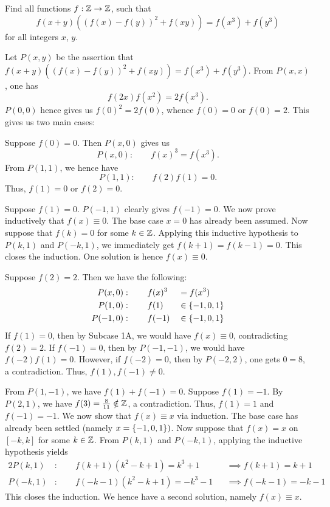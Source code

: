 \begin{question}\label{A::2023-O-2-4}
    Find all functions $f : \mathbb{Z} \to \mathbb{Z}$, such that \[f(x+y)((f(x) - f(y))^2 + f(xy)) = f(x^3) + f(y^3)\] for all integers $x$, $y$.
\end{question}
\begin{solution*}
    Let $P(x, y)$ be the assertion that $f(x+y)((f(x) - f(y))^2 + f(xy)) = f(x^3) + f(y^3)$. From $P(x, x)$, one has \[f(2x)f(x^2) = 2f(x^3).\] $P(0, 0)$ hence gives us $f(0)^2 = 2f(0)$, whence $f(0) = 0$ or $f(0) = 2$. This gives us two main cases:

     Suppose $f(0) = 0$. Then $P(x, 0)$ gives us \[P(x, 0) : \qquad f(x)^3 = f(x^3).\] From $P(1, 1)$, we hence have \[P(1, 1) : \qquad f(2)f(1) = 0.\] Thus, $f(1) = 0$ or $f(2) = 0$.

     Suppose $f(1) = 0$. $P(-1, 1)$ clearly gives $f(-1) = 0$. We now prove inductively that $f(x) \equiv 0$. The base case $x = 0$ has already been assumed. Now suppose that $f(k) = 0$ for some $k \in \mathbb{Z}$. Applying this inductive hypothesis to $P(k, 1)$ and $P(-k, 1)$, we immediately get $f(k + 1) = f(k - 1) = 0$. This closes the induction. One solution is hence $f(x) \equiv 0$.

     Suppose $f(2) = 2$. Then we have the following:
    \begin{alignat*}{2}
        P(x, 0) &: \qquad f(x)^3 &&= f(x^3)\\
        P(1, 0) &: \qquad f(1) &&\in \left\lbrace -1, 0, 1 \right\rbrace\\
        P(-1, 0) &: \qquad f(-1) &&\in \left\lbrace -1, 0, 1 \right\rbrace
    \end{alignat*} 
    If $f(1) = 0$, then by Subcase 1A, we would have $f(x) \equiv 0$, contradicting $f(2) = 2$. If $f(-1) = 0$, then by $P(-1, -1)$, we would have $f(-2)f(1) = 0$. However, if $f(-2) = 0$, then by $P(-2, 2)$, one gets $0 = 8$, a contradiction. Thus, $f(1), f(-1) \neq 0$.

    From $P(1, -1)$, we have $f(1) + f(-1) = 0$. Suppose $f(1) = -1$. By $P(2, 1)$, we have $f(3) = \frac8{11} \notin \mathbb{Z}$, a contradiction. Thus, $f(1) = 1$ and $f(-1) = -1$. We now show that $f(x) \equiv x$ via induction. The base case has already been settled (namely $x = \left\lbrace -1, 0, 1 \right\rbrace)$. Now suppose that $f(x) = x$ on $[-k, k]$ for some $k \in \mathbb{Z}$. From $P(k, 1)$ and $P(-k, 1)$, applying the inductive hypothesis yields
    \begin{alignat*}{2}
        P(k, 1) &: \qquad f(k+1)(k^2 - k + 1) = k^3 + 1 &&\implies f(k+1) = k+1\\
        P(-k, 1) &: \qquad f(-k-1)(k^2 - k + 1) = -k^3 -1 &&\implies f(-k-1) = -k-1
    \end{alignat*}
    This closes the induction. We hence have a second solution, namely $f(x) \equiv x$.


\end{solution*}
